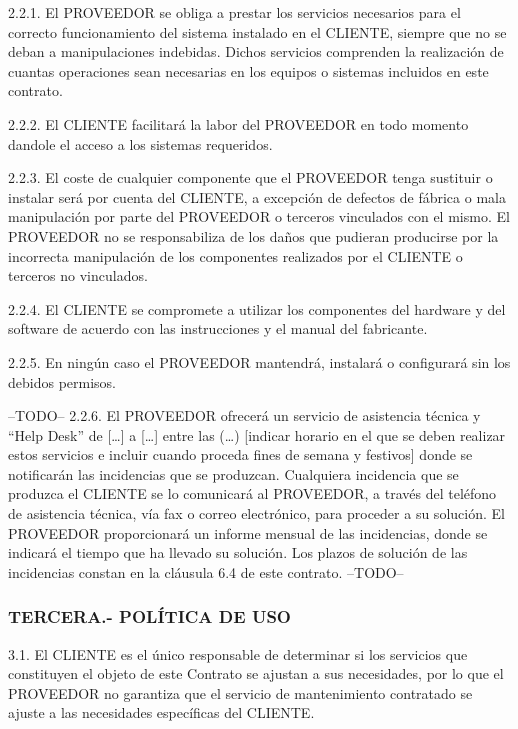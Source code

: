 \documentclass['12pt',spanish,a4paper,]{article}
\begin{document}
2.2.1. El PROVEEDOR se obliga a prestar los servicios necesarios para el
correcto funcionamiento del sistema instalado en el CLIENTE, siempre que
no se deban a manipulaciones indebidas. Dichos servicios comprenden la
realización de cuantas operaciones sean necesarias en los equipos o
sistemas incluidos en este contrato.

2.2.2. El CLIENTE facilitará la labor del PROVEEDOR en todo momento
dandole el acceso a los sistemas requeridos.

2.2.3. El coste de cualquier componente que el PROVEEDOR tenga sustituir
o instalar será por cuenta del CLIENTE, a excepción de defectos de
fábrica o mala manipulación por parte del PROVEEDOR o terceros
vinculados con el mismo. El PROVEEDOR no se responsabiliza de los daños
que pudieran producirse por la incorrecta manipulación de los
componentes realizados por el CLIENTE o terceros no vinculados.

2.2.4. El CLIENTE se compromete a utilizar los componentes del hardware
y del software de acuerdo con las instrucciones y el manual del
fabricante.

2.2.5. En ningún caso el PROVEEDOR mantendrá, instalará o configurará
sin los debidos permisos.

--TODO-- 2.2.6. El PROVEEDOR ofrecerá un servicio de asistencia técnica
y ``Help Desk'' de {[}\ldots{}{]} a {[}\ldots{}{]} entre las (\ldots{})
{[}indicar horario en el que se deben realizar estos servicios e incluir
cuando proceda fines de semana y festivos{]} donde se notificarán las
incidencias que se produzcan. Cualquiera incidencia que se produzca el
CLIENTE se lo comunicará al PROVEEDOR, a través del teléfono de
asistencia técnica, vía fax o correo electrónico, para proceder a su
solución. El PROVEEDOR proporcionará un informe mensual de las
incidencias, donde se indicará el tiempo que ha llevado su solución. Los
plazos de solución de las incidencias constan en la cláusula 6.4 de este
contrato. --TODO--

\subsubsection{TERCERA.- POLÍTICA DE
USO}\label{tercera.--poluxedtica-de-uso}

3.1. El CLIENTE es el único responsable de determinar si los servicios
que constituyen el objeto de este Contrato se ajustan a sus necesidades,
por lo que el PROVEEDOR no garantiza que el servicio de mantenimiento
contratado se ajuste a las necesidades específicas del CLIENTE.
\end{document}
